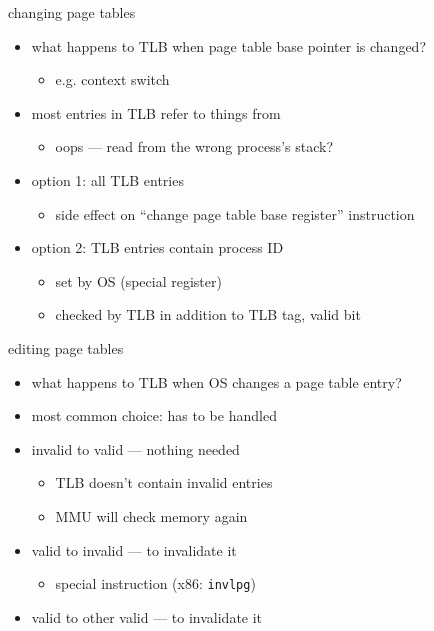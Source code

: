 \begin{frame}{changing page tables}
\begin{itemize}
\item what happens to TLB when page table base pointer is changed?
    \begin{itemize}
    \item e.g. context switch
    \end{itemize}
\item most entries in TLB refer to things from 
    \begin{itemize}
    \item oops --- read from the wrong process's stack?
    \end{itemize}
\vspace{.5cm}
\item<2-> option 1:  all TLB entries
    \begin{itemize}
    \item side effect on ``change page table base register'' instruction
    \end{itemize}
\item<3-> option 2: TLB entries contain process ID
    \begin{itemize}
    \item set by OS (special register)
    \item checked by TLB in addition to TLB tag, valid bit
    \end{itemize}
\end{itemize}
\end{frame}

\begin{frame}{editing page tables}
\begin{itemize}
\item what happens to TLB when OS changes a page table entry?
\item most common choice: has to be handled 
\vspace{.5cm}
\item<2-> invalid to valid --- nothing needed
    \begin{itemize}
    \item TLB doesn't contain invalid entries
    \item MMU will check memory again
    \end{itemize}
\item<2-> valid to invalid ---  to invalidate it
    \begin{itemize}
    \item special instruction (x86: {\tt invlpg})
    \end{itemize}
\item<2-> valid to other valid ---  to invalidate it
\end{itemize}
\end{frame}

